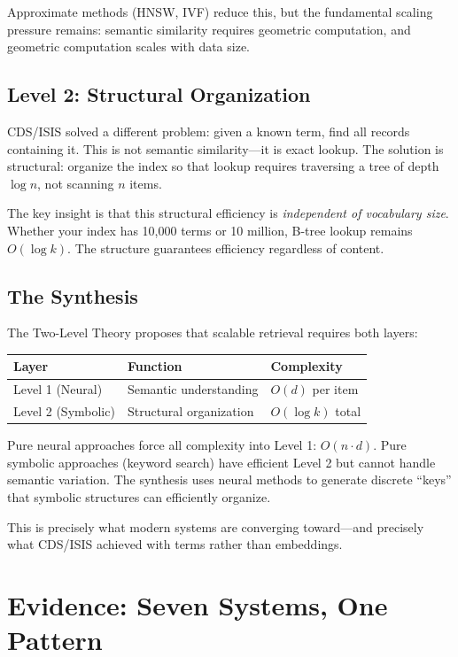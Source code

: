 \documentclass[manuscript,screen,nonacm]{acmart}
\begin{document}
Approximate methods (HNSW, IVF) reduce this, but the fundamental scaling pressure remains: semantic similarity requires geometric computation, and geometric computation scales with data size.

\subsection{Level 2: Structural Organization}

CDS/ISIS solved a different problem: given a known term, find all records containing it. This is not semantic similarity---it is exact lookup. The solution is structural: organize the index so that lookup requires traversing a tree of depth $\log n$, not scanning $n$ items.

The key insight is that this structural efficiency is \emph{independent of vocabulary size}. Whether your index has 10,000 terms or 10 million, B-tree lookup remains $O(\log k)$. The structure guarantees efficiency regardless of content.

\subsection{The Synthesis}

The Two-Level Theory proposes that scalable retrieval requires both layers:

\begin{center}
\begin{tabular}{lll}
\toprule
\textbf{Layer} & \textbf{Function} & \textbf{Complexity} \\
\midrule
Level 1 (Neural) & Semantic understanding & $O(d)$ per item \\
Level 2 (Symbolic) & Structural organization & $O(\log k)$ total \\
\bottomrule
\end{tabular}
\end{center}

Pure neural approaches force all complexity into Level 1: $O(n \cdot d)$. Pure symbolic approaches (keyword search) have efficient Level 2 but cannot handle semantic variation. The synthesis uses neural methods to generate discrete ``keys'' that symbolic structures can efficiently organize.

This is precisely what modern systems are converging toward---and precisely what CDS/ISIS achieved with terms rather than embeddings.

\section{Evidence: Seven Systems, One Pattern}
\end{document}
